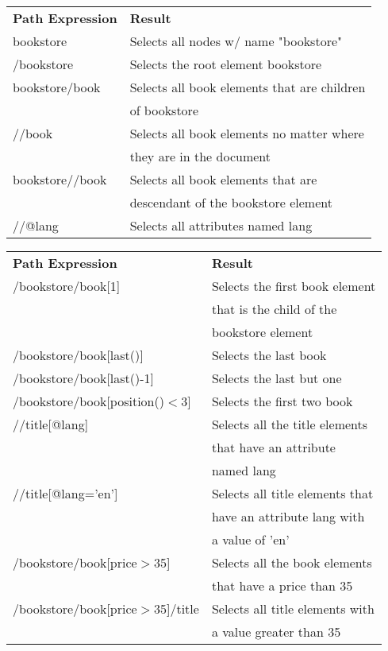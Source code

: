 \documentclass[10pt,landscape]{article}
\begin{document}
\begin{multicols}{3}
\begin{tabular}{@{}ll@{}}
 \textbf{Path Expression} & \textbf{Result}\\
bookstore & Selects all nodes w/ name "bookstore"\\
/bookstore & Selects the root element bookstore\\
bookstore/book & Selects all book elements that are children \\
 & of bookstore\\
//book & Selects all book elements no matter where \\
 & they are in the document\\
bookstore//book & Selects all book elements that are \\
 & descendant of the bookstore element\\
//@lang & Selects all attributes named lang\\

\end{tabular}

\begin{tabular}{@{}ll@{}}
 \textbf{Path Expression} & \textbf{Result}\\
/bookstore/book[1]  & Selects the first book element \\
  & that is the child of the\\
  & bookstore element\\
/bookstore/book[last()] & Selects the last book \\
/bookstore/book[last()-1] & Selects the last but one\\
/bookstore/book[position()$<$3] & Selects the first two book\\
//title[@lang]  & Selects all the title elements \\
  & that have an attribute \\
    & named lang\\
//title[@lang='en'] & Selects all title elements that\\ 
  & have an attribute lang with\\
   & a value of 'en'\\
/bookstore/book[price$>$35] & Selects all the book elements\\
  & that have a price than 35\\
/bookstore/book[price$>$35]/title & Selects all title elements with\\
  & a value greater than 35\\

\end{tabular}





\end{multicols}
\end{document}
